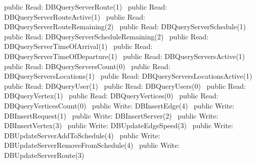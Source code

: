 public \LA{}Read: DBQueryServerRoute(1)~{\nwtagstyle{}}\RA{}
public \LA{}Read: DBQueryServerRouteActive(1)~{\nwtagstyle{}}\RA{}
public \LA{}Read: DBQueryServerRouteRemaining(2)~{\nwtagstyle{}}\RA{}
public \LA{}Read: DBQueryServerSchedule(1)~{\nwtagstyle{}}\RA{}
public \LA{}Read: DBQueryServerScheduleRemaining(2)~{\nwtagstyle{}}\RA{}
public \LA{}Read: DBQueryServerTimeOfArrival(1)~{\nwtagstyle{}}\RA{}
public \LA{}Read: DBQueryServerTimeOfDeparture(1)~{\nwtagstyle{}}\RA{}
public \LA{}Read: DBQueryServersActive(1)~{\nwtagstyle{}}\RA{}
public \LA{}Read: DBQueryServersCount(0)~{\nwtagstyle{}}\RA{}
public \LA{}Read: DBQueryServersLocations(1)~{\nwtagstyle{}}\RA{}
public \LA{}Read: DBQueryServersLocationsActive(1)~{\nwtagstyle{}}\RA{}
public \LA{}Read: DBQueryUser(1)~{\nwtagstyle{}}\RA{}
public \LA{}Read: DBQueryUsers(0)~{\nwtagstyle{}}\RA{}
public \LA{}Read: DBQueryVertex(1)~{\nwtagstyle{}}\RA{}
public \LA{}Read: DBQueryVertices(0)~{\nwtagstyle{}}\RA{}
public \LA{}Read: DBQueryVerticesCount(0)~{\nwtagstyle{}}\RA{}
\nwendcode{}\nwdocspar
{}
\nwenddocs{}\plusendmoddef
public \LA{}Write: DBInsertEdge(4)~{\nwtagstyle{}}\RA{}
public \LA{}Write: DBInsertRequest(1)~{\nwtagstyle{}}\RA{}
public \LA{}Write: DBInsertServer(2)~{\nwtagstyle{}}\RA{}
public \LA{}Write: DBInsertVertex(3)~{\nwtagstyle{}}\RA{}
public \LA{}Write: DBUpdateEdgeSpeed(3)~{\nwtagstyle{}}\RA{}
public \LA{}Write: DBUpdateServerAddToSchedule(4)~{\nwtagstyle{}}\RA{}
public \LA{}Write: DBUpdateServerRemoveFromSchedule(4)~{\nwtagstyle{}}\RA{}
public \LA{}Write: DBUpdateServerRoute(3)~{\nwtagstyle{}}\RA{}
\nwendcode{}\nwdocspar
{}
\nwenddocs{}\plusendmoddef

